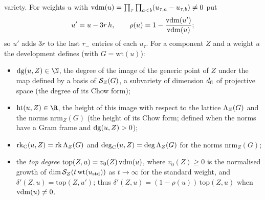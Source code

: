 variety. For weights $u$ with $\mathrm{vdm}(u)=\prod_\tau\prod_{a<b}(u_{\tau,a}-u_{\tau,b})\ne0$ put
\begin{equation}\label{pf:lift1:eq:rho}
u'=u-3r\,h,\qquad\rho(u)=1-\frac{\mathrm{vdm}(u')}{\mathrm{vdm}(u)};
\end{equation}
so $u'$ adds $3r$ to the last $r_-$ entries of each $u_\tau$. For a component $Z$ and a weight $u$ the
development defines (with $G=\mathrm{wt}(u)$):
\begin{itemize}
\item $\liftonedg(u,Z)\in\N$, the degree of the image of the generic point of $Z$ under the map defined
  by a basis of $\mathcal S_Z(G)$, a subvariety of dimension $d_{\mathrm{fl}}$ of projective space (the
  degree of its Chow form);
\item $\liftonehgt(u,Z)\in\R$, the height of this image with respect to the lattice $\Lambda_Z(G)$
  and the norms $\mathrm{nrm}_Z(G)$ (the height of its Chow form; defined when the norms have a Gram
  frame and $\mathrm{dg}(u,Z)>0$);
\item $\mathrm{rk}_{\mathrm{C}}(u,Z)=\operatorname{rk}\Lambda_Z(G)$ and $\mathrm{deg}_{\mathrm{C}}(u,Z)=\deg\Lambda_Z(G)$ for the
  norms $\mathrm{nrm}_Z(G)$;
\item the \emph{top degree} $\mathrm{top}(Z,u)=v_0(Z)\,\mathrm{vdm}(u)$, where $v_0(Z)\ge0$ is the
  normalised growth of $\dim\mathcal S_Z(t\,\mathrm{wt}(u_{\mathrm{std}}))$ as $t\to\infty$ for the
  standard weight, and $\delta'(Z,u)=\mathrm{top}(Z,u')$; thus
  $\delta'(Z,u)=(1-\rho(u))\,\mathrm{top}(Z,u)$ when $\mathrm{vdm}(u)\ne0$.
\end{itemize}

